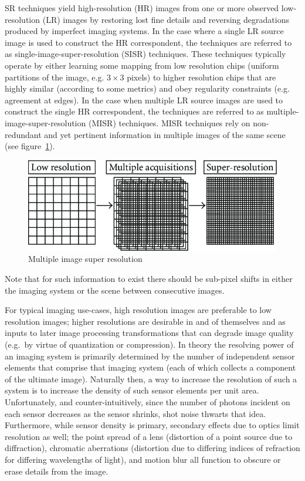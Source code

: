 SR techniques yield high-resolution (HR) images from one or more observed low-resolution (LR) images by restoring lost fine details and reversing degradations produced by imperfect imaging systems.
%
In the case where a single LR source image is used to construct the HR correspondent, the techniques are referred to as single-image-super-resolution (SISR) techniques.
%
These techniques typically operate by either learning some mapping from low resolution chips (uniform partitions of the image, e.g. $3\times 3$ pixels) to higher resolution chips that are highly similar (according to some metrics) and obey regularity constraints (e.g. agreement at edges).
%
In the case when multiple LR source images are used to construct the single HR correspondent, the techniques are referred to as multiple-image-super-resolution (MISR) techniques.
%
MISR techniques rely on non-redundant and yet pertinent information in multiple images of the same scene (see figure~\ref{fig:misr}).
\begin{figure}
	\includegraphics[width=\linewidth,keepaspectratio]{figures/classical/misr.png}
	\caption{Multiple image super resolution\cite{misr}}
	\label{fig:misr}
\end{figure}
%
Note that for such information to exist there should be sub-pixel shifts in either the imaging system or the scene between consecutive images.


For typical imaging use-cases, high resolution images are preferable to low resolution images; higher resolutions are
desirable in and of themselves and as inputs to later image processing transformations that can degrade image quality (e.g.\ by virtue of quantization or compression).
%
In theory the resolving power of an imaging system is primarily determined by the number of independent sensor elements that comprise that imaging system (each of which collects a component of the ultimate image).
%
Naturally then, a way to increase the resolution of such a system is to increase the density of such sensor elements per unit area.
%
Unfortunately, and counter-intuitively, since the number of photons incident on each sensor decreases as the sensor shrinks, shot noise thwarts that idea.
%
Furthermore, while sensor density is primary, secondary effects due to optics limit resolution as well;
the point spread of a lens (distortion of a point source due to diffraction), chromatic aberrations (distortion due to differing indices of refraction for differing wavelengths of light), and motion blur all function to obscure or erase details from the image.

